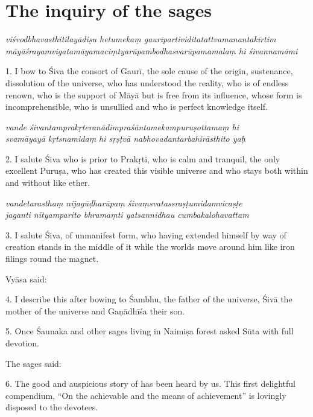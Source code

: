 \chapter{The inquiry of the sages}

\begin{shloka}\itshape
  viśvodbhavasthitilayādiṣu hetumekaṃ gaurīpartividitatattvamanantakīrtim\\ māyāśrayamvigatamāyamaciṃtyarūpambodhasvarūpamamalaṃ hi śivannamāmi
\end{shloka}

1. I bow to Śiva the consort of Gaurī, the sole cause of the origin, sustenance,
dissolution of the universe, who has understood the reality, who is of endless
renown, who is the support of Māyā but is free from its influence, whose form is
incomprehensible, who is unsullied and who is perfect knowledge itself.

\begin{shloka}\itshape
  vande śivantamprakṛteranādimpraśāntamekampuruṣottamaṃ hi\\
  svamāyayā kṛtsnamidaṃ hi sṛṣṭvā nabhovadantarbahirāsthito yaḥ
\end{shloka}

2. I salute Śiva who is prior to Prakṛti, who is calm and tranquil, the only
excellent Puruṣa, who has created this visible universe and who stays both
within and without like ether.

\begin{shloka}\itshape
  vandetarasthaṃ nijagūḍharūpaṃ śivaṃsvatassraṣṭumidamvicaṣṭe\\
  jaganti nityamparito bhramaṃti yatsannidhau cumbakalohavattam
\end{shloka}

3. I salute Śiva, of unmanifest form, who having extended himself by way of
creation stands in the middle of it while the worlds move around him like iron
filings round the magnet.

Vyāsa said:

4. I describe this after bowing to Śambhu, the father of the universe, Śivā
the mother of the universe and Gaṇādhīśa their son.

5. Once Śaunaka and other sages living in Naimiṣa forest asked Sūta with full
devotion.

The sages said:

6. The good and auspicious story of  has been heard by us.
This first delightful compendium, “On the achievable and the means of
achievement” is lovingly disposed to the devotees.

